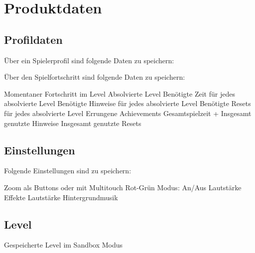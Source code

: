 \section{Produktdaten}

\subsection{Profildaten}
\begin{requirements}
	 Über ein Spielerprofil sind folgende Daten zu speichern:\\
	\begin{requirements}
	\end{requirements}
	
	 Über den Spielfortschritt sind folgende Daten zu speichern:\\
	\begin{requirements}
		 Momentaner Fortschritt im Level
		 Absolvierte Level
		 Benötigte Zeit für jedes absolvierte Level
		 Benötigte Hinweise für jedes absolvierte Level
		 Benötigte Resets für jedes absolvierte Level
		 Errungene Achievements
		 Gesamtspielzeit
		+ Insgesamt genutzte Hinweise
		 Insgesamt genutzte Resets
	\end{requirements}
\end{requirements}

\subsection{Einstellungen}
\begin{requirements}
	 Folgende Einstellungen sind zu speichern:\\
	\begin{requirements}
		 Zoom als Buttons oder mit Multitouch
		 Rot-Grün Modus: An/Aus
		 Lautstärke Effekte
		 Lautstärke Hintergrundmusik
	\end{requirements}


\end{requirements}

\subsection{Level}
\begin{requirements}
	 Gespeicherte Level im Sandbox Modus
\end{requirements}
	
